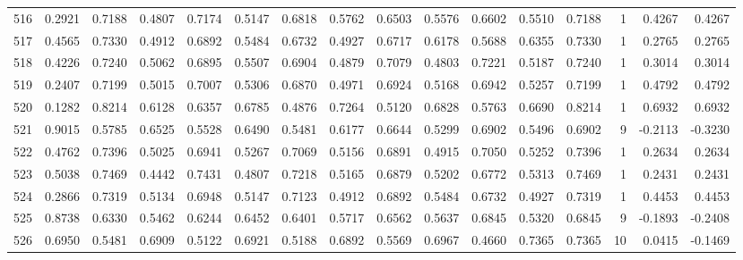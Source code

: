 \begin{tabular}{lrrrrrrrrrrrrrrr}
516 &      0.2921 &  0.7188 &  0.4807 &  0.7174 &  0.5147 &  0.6818 &  0.5762 &  0.6503 &  0.5576 &  0.6602 &   0.5510 &     0.7188 &      1 &                    0.4267 &                     0.4267 \\
517 &      0.4565 &  0.7330 &  0.4912 &  0.6892 &  0.5484 &  0.6732 &  0.4927 &  0.6717 &  0.6178 &  0.5688 &   0.6355 &     0.7330 &      1 &                    0.2765 &                     0.2765 \\
518 &      0.4226 &  0.7240 &  0.5062 &  0.6895 &  0.5507 &  0.6904 &  0.4879 &  0.7079 &  0.4803 &  0.7221 &   0.5187 &     0.7240 &      1 &                    0.3014 &                     0.3014 \\
519 &      0.2407 &  0.7199 &  0.5015 &  0.7007 &  0.5306 &  0.6870 &  0.4971 &  0.6924 &  0.5168 &  0.6942 &   0.5257 &     0.7199 &      1 &                    0.4792 &                     0.4792 \\
520 &      0.1282 &  0.8214 &  0.6128 &  0.6357 &  0.6785 &  0.4876 &  0.7264 &  0.5120 &  0.6828 &  0.5763 &   0.6690 &     0.8214 &      1 &                    0.6932 &                     0.6932 \\
521 &      0.9015 &  0.5785 &  0.6525 &  0.5528 &  0.6490 &  0.5481 &  0.6177 &  0.6644 &  0.5299 &  0.6902 &   0.5496 &     0.6902 &      9 &                   -0.2113 &                    -0.3230 \\
522 &      0.4762 &  0.7396 &  0.5025 &  0.6941 &  0.5267 &  0.7069 &  0.5156 &  0.6891 &  0.4915 &  0.7050 &   0.5252 &     0.7396 &      1 &                    0.2634 &                     0.2634 \\
523 &      0.5038 &  0.7469 &  0.4442 &  0.7431 &  0.4807 &  0.7218 &  0.5165 &  0.6879 &  0.5202 &  0.6772 &   0.5313 &     0.7469 &      1 &                    0.2431 &                     0.2431 \\
524 &      0.2866 &  0.7319 &  0.5134 &  0.6948 &  0.5147 &  0.7123 &  0.4912 &  0.6892 &  0.5484 &  0.6732 &   0.4927 &     0.7319 &      1 &                    0.4453 &                     0.4453 \\
525 &      0.8738 &  0.6330 &  0.5462 &  0.6244 &  0.6452 &  0.6401 &  0.5717 &  0.6562 &  0.5637 &  0.6845 &   0.5320 &     0.6845 &      9 &                   -0.1893 &                    -0.2408 \\
526 &      0.6950 &  0.5481 &  0.6909 &  0.5122 &  0.6921 &  0.5188 &  0.6892 &  0.5569 &  0.6967 &  0.4660 &   0.7365 &     0.7365 &     10 &                    0.0415 &                    -0.1469 \\

\end{tabular}
